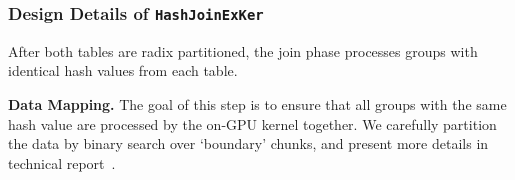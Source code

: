 \subsubsection{\textbf{Design Details of \texttt{HashJoinExKer}}}
After both tables are radix partitioned, the join phase processes groups with identical hash values from each table.

\noindent
\textbf{Data Mapping.}
The goal of this step is to ensure that all groups with the same hash value are processed by the on-GPU kernel together. 
We carefully partition the data by binary search over `boundary' chunks, and present more details in technical report~\cite{vortex-technical-report}.


